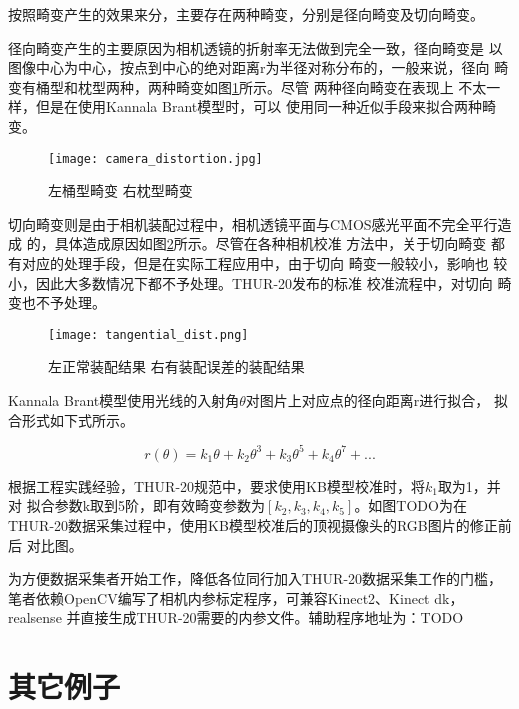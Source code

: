 按照畸变产生的效果来分，主要存在两种畸变，分别是径向畸变及切向畸变。

径向畸变产生的主要原因为相机透镜的折射率无法做到完全一致，径向畸变是
以图像中心为中心，按点到中心的绝对距离r为半径对称分布的，一般来说，径向
畸变有桶型和枕型两种，两种畸变如图\ref{fig:radial_distort}所示。尽管
两种径向畸变在表现上 不太一样，但是在使用Kannala Brant模型时，可以
使用同一种近似手段来拟合两种畸变。

\begin{figure}[h] %
  \centering
  \texttt{[image: camera\_distortion.jpg]}
  \caption{左桶型畸变 右枕型畸变}
  \label{fig:radial_distort}
\end{figure}

切向畸变则是由于相机装配过程中，相机透镜平面与CMOS感光平面不完全平行造成
的，具体造成原因如图\ref{fig:tangential_distort}所示。尽管在各种相机校准
方法中，关于切向畸变 都有对应的处理手段，但是在实际工程应用中，由于切向
畸变一般较小，影响也 较小，因此大多数情况下都不予处理。THUR-20发布的标准
校准流程中，对切向 畸变也不予处理。

\begin{figure}[h] %
  \centering
  \texttt{[image: tangential\_dist.png]}
  \caption{左正常装配结果 右有装配误差的装配结果}
  \label{fig:tangential_distort}
\end{figure}

Kannala Brant模型使用光线的入射角$\theta$对图片上对应点的径向距离r进行拟合，
拟合形式如下式所示。

\begin{equation}
  r(\theta) = k_1\theta + k_2\theta^{3} + k_3\theta^{5} + k_4\theta^{7} + ...
\end{equation}

根据工程实践经验，THUR-20规范中，要求使用KB模型校准时，将$k_1$取为1，并对
拟合参数{k}取到5阶，即有效畸变参数为$[k_2, k_3, k_4, k_5]$。如图TODO为在
THUR-20数据采集过程中，使用KB模型校准后的顶视摄像头的RGB图片的修正前后
对比图。

为方便数据采集者开始工作，降低各位同行加入THUR-20数据采集工作的门槛，
笔者依赖OpenCV编写了相机内参标定程序，可兼容Kinect2、Kinect dk，realsense
并直接生成THUR-20需要的内参文件。辅助程序地址为：TODO


\section{其它例子}
\label{sec:other}

